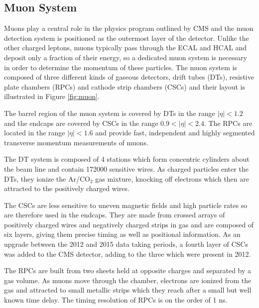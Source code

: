  \subsection{Muon System}

Muons play a central role in the physics program outlined
 by CMS and the muon detection system is positioned 
 as the outermost layer of the detector. 
Unlike the other charged leptons, 
 muons typically pass through the ECAL and HCAL and
 deposit only a fraction of their energy, so
 a dedicated muon system is necessary in order to
 determine the momentum of these particles.
The muon system is composed of three different kinds
 of gaseous detectors,
 drift tubes (DTs), resistive plate chambers (RPCs)
 and cathode strip chambers (CSCs) and their layout is
 illustrated in Figure \ref{fig:muon}.

The barrel region of the muon system is covered by DTs
 in the range $|\eta|<1.2$ and the endcaps are covered 
 by CSCs in the range $0.9<|\eta|<2.4$.
The RPCs are located
 in the range $|\eta|<1.6$ and provide fast,
 independent and highly segmented transverse
 momentum measurements of muons. 

The DT system is composed of 4 stations which 
 form concentric cylinders about the beam line
 and contain 172000 sensitive wires. 
As charged particles enter the DTs,
 they ionize the Ar/CO$_2$ gas mixture,
 knocking off electrons  which 
 then are attracted to the positively charged wires.

The CSCs are less sensitive to uneven magnetic fields
 and high particle rates so are therefore used in the endcaps.
They are made from crossed arrays of positively 
 charged wires and negatively charged strips
 in gas and are composed
 of six layers, giving them precise timing
 as well as positional information. 
As an upgrade between the 2012 and 2015 data taking periods,
 a fourth layer of CSCs was added to the CMS detector, 
 adding to the three which were present in 2012.

The RPCs are built from two sheets held at opposite
 charges and separated by a gas volume.
As muons move through the chamber, electrons
 are ionized from the gas and attracted to small
 metallic strips which they reach after a small
 but well known time delay. 
The timing resolution of RPCs is on the order of 1 ns. 

